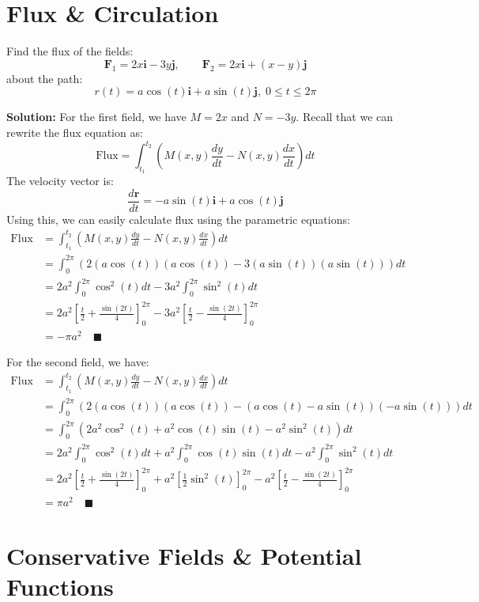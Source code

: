 \documentclass[letterpaper, 11pt]{article}
\begin{document}
\section{Flux \& Circulation}
Find the flux of the fields:
\[ \bm{F}_1 = 2x\bm{i} - 3y\bm{j}, \qquad \bm{F}_2 = 2x\bm{i} + (x - y)\bm{j} \]
about the path:
\[r(t) = a\cos(t)\bm{i} + a\sin(t)\bm{j},\; 0 \leq t \leq 2 \pi \]
\par \textbf{Solution:} For the first field, we have $M = 2x$ and $N = -3y$. Recall that we can rewrite the flux equation as:
\[ \text{Flux} = \int_{t_1}^{t_2} \left(M(x,y) \frac{dy}{dt} - N(x,y) \frac{dx}{dt}\right) dt \]
The velocity vector is:
\[ \frac{ d\bm{r}}{dt} = - a\sin(t) \bm{i} + a \cos (t) \bm{j} \]
Using this, we can easily calculate flux using the parametric equations:
\begin{align*}
\text{Flux} &= \int_{t_1}^{t_2} \left(M(x,y) \frac{dy}{dt} - N(x,y) \frac{dx}{dt}\right) dt \\
&= \int_0^{2\pi} \left( 2(a\cos(t))(a \cos(t))  -3(a\sin(t))(a \sin(t))  \right) dt \\
&= 2a^2 \int_0^{2\pi} \cos^2(t)dt  -3a^2\int_0^{2\pi} \sin^2(t)dt \\
&= 2a^2 \left[ \frac{t}{2}+ \frac{ \sin (2t)}{4} \right]_0^{2\pi} - 3a^2 \left[ \frac{t}{2} - \frac{ \sin(2t)}{4} \right]_0^{2\pi}\\
&= -\pi a^2 \quad\blacksquare
\end{align*}

\par For the second field, we have:
\begin{align*}
\text{Flux} &= \int_{t_1}^{t_2} \left(M(x,y) \frac{dy}{dt} - N(x,y) \frac{dx}{dt}\right) dt \\
&=  \int_{0}^{2 \pi} \left(2(a\cos(t)) (a \cos(t)) - (a \cos(t) - a \sin(t))(-a\sin(t))\right) dt \\
&=  \int_{0}^{2 \pi} \left(2a^2 \cos^2(t) + a^2 \cos(t)\sin(t) - a^2 \sin^2(t)\right) dt \\
&=  2a^2 \int_{0}^{2 \pi} \cos^2(t)dt + a^2 \int_{0}^{2 \pi}\cos(t)\sin(t)dt - a^2 \int_{0}^{2 \pi}\sin^2(t)dt \\
&=  2a^2 \left[ \frac{t}{2} + \frac{ \sin (2t)}{4}  \right]_0^{2\pi} + a^2\left[ \frac{1}{2} \sin^2(t) \right]_0^{2\pi} - a^2 \left[ \frac{t}{2} - \frac{ \sin (2t)}{4}  \right]_0^{2\pi} \\
&= \pi a^2 \quad\blacksquare
\end{align*}


\section{Conservative Fields \& Potential Functions}
\end{document}
